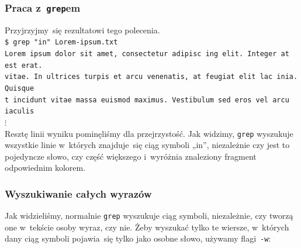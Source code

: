 \documentclass[10pt,t]{beamer}
\begin{document}
\begin{frame}
  \frametitle{Praca z~\texttt{grep}em}


  Przyjrzyjmy~się rezultatowi tego polecenia. \\
  \texttt{\$ grep "in"{} Lorem-ipsum.txt} \\
  \texttt{Lorem ipsum dolor sit amet, consectetur
    adipisc{\color{red} in}g elit. Integer at est erat.} \\
  \texttt{vitae. In ultrices turpis et arcu venenatis, at feugiat elit
    lac{\color{red} in}ia. Quisque} \\
  \texttt{t{\color{red} in}cidunt vitae massa euismod maximus. Vestibulum
    sed eros vel arcu iaculis} \\
  \hspace{1em} $\vdots$ \\
  Resztę linii wyniku pominęliśmy dla przejrzystość. Jak widzimy,
  \texttt{grep} wyszukuje wszystkie linie w~których znajduje~się ciąg
  symboli „in”, niezależnie czy jest to pojedyncze słowo, czy część
  większego i~wyróżnia znaleziony fragment odpowiednim kolorem.

\end{frame}











\begin{frame}
  \frametitle{Wyszukiwanie całych wyrazów}


  Jak widzieliśmy, normalnie \texttt{grep} wyszukuje ciąg symboli,
  niezależnie, czy tworzą one w~tekście osoby wyraz, czy nie. Żeby
  wyszukać tylko te wiersze, w~których dany ciąg symboli pojawia~się
  tylko jako osobne słowo, używamy flagi~\texttt{-w}: \\

\end{frame}
\end{document}
